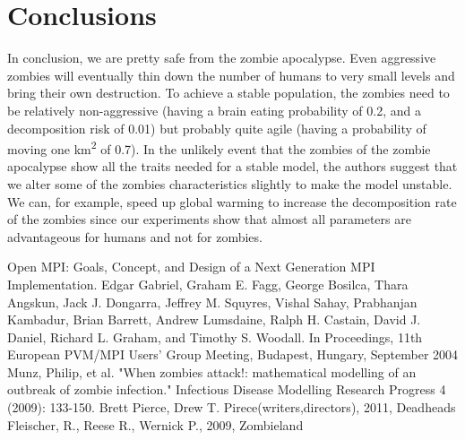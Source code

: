 \documentclass{article}
\begin{document}
\section{Conclusions}
In conclusion, we are pretty safe from the zombie apocalypse. Even aggressive zombies will eventually thin down the number of humans to very small levels and bring their own destruction. To achieve a stable population, the zombies need to be relatively non-aggressive (having a brain eating probability of 0.2, and a decomposition risk of 0.01) but probably quite agile (having a probability of moving one km\textsuperscript{2} of 0.7). In the unlikely event that the zombies of the zombie apocalypse show all the traits needed for a stable model, the authors suggest that we alter some of the zombies characteristics slightly to make the model unstable. We can, for example, speed up global warming to increase the decomposition rate of the zombies since our experiments show that almost all parameters are advantageous for humans and not for zombies.

\begin{thebibliography}{99}
Open MPI: Goals, Concept, and Design of a Next Generation MPI Implementation. Edgar Gabriel, Graham E. Fagg, George Bosilca, Thara Angskun, Jack J. Dongarra, Jeffrey M. Squyres, Vishal Sahay, Prabhanjan Kambadur, Brian Barrett, Andrew Lumsdaine, Ralph H. Castain, David J. Daniel, Richard L. Graham, and Timothy S. Woodall. In Proceedings, 11th European PVM/MPI Users' Group Meeting, Budapest, Hungary, September 2004
Munz, Philip, et al. "When zombies attack!: mathematical modelling of an outbreak of zombie infection." Infectious Disease Modelling Research Progress 4 (2009): 133-150.
Brett Pierce, Drew T. Pirece(writers,directors), 2011, Deadheads
Fleischer, R., Reese R., Wernick P., 2009, Zombieland 
\end{thebibliography}
\end{document}
